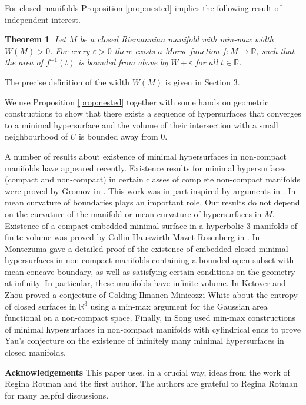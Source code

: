\documentclass[12pt]{amsart}
\newtheorem{theorem}{Theorem}[section]
\newcommand{\R}{\mathbb{R}}
\theoremstyle{definition}
\begin{document}
For closed manifolds Proposition \ref*{prop:nested} implies the
following result of independent interest.

\begin{theorem}
Let $M$ be a closed Riemannian manifold with min-max width $W(M)>0$.
For every $\varepsilon>0$ there exists a Morse function
$f: M \rightarrow \R$, such that the area of $f^{-1}(t)$
is bounded from above by $W+ \varepsilon$ for all $t \in \R$.
\end{theorem}

The precise definition of the width $W(M)$ is given in Section 3.

We use Proposition \ref*{prop:nested} together with some hands on geometric constructions
to show that there exists a sequence of hypersurfaces that converges to 
a minimal hypersurface and the volume of their intersection with a small neighbourhood of $U$
is bounded away from $0$.

A number of results about existence of minimal hypersurfaces
in non-compact manifolds have appeared recently.
Existence results for minimal hypersurfaces 
(compact and non-compact) in 
certain classes of complete non-compact manifolds
were proved by Gromov in \cite{Gr}.
This work was in part inspired by arguments in \cite{Gr}.
In \cite{Gr} mean curvature of boundaries
plays an important role.
Our results do not depend on the curvature of the 
manifold or mean curvature of hypersurfaces in $M$.
Existence of a compact embedded minimal surface in a hyperbolic 3-manifolds of finite volume
was proved by Collin-Hauswirth-Mazet-Rosenberg
in \cite{CHMR}.
In \cite{Mo} Montezuma gave a detailed proof 
of the existence of embedded closed minimal hypersurfaces in non-compact 
manifolds containing a bounded open subset with mean-concave boundary, 
as well as satisfying certain conditions
on the geometry at infinity.
In particular, these manifolds have infinite volume.
In \cite{KZ} Ketover and Zhou proved a
conjecture of Colding-Ilmanen-Minicozzi-White
about the entropy of closed surfaces in $\mathbb{R}^3$
using a min-max argument for the Gaussian area functional
on a non-compact space.
Finally, in \cite{So2} Song used min-max constructions of minimal
hypersurfaces in non-compact manifolds with cylindrical ends
to prove Yau's conjecture on the existence of infinitely many
minimal hypersurfaces in closed manifolds.

\bigskip

\noindent
\textbf{Acknowledgements} 
This paper uses, in a crucial way,
ideas from the work of Regina Rotman and the first author. The authors are grateful to 
Regina Rotman for many helpful discussions.
\end{document}

